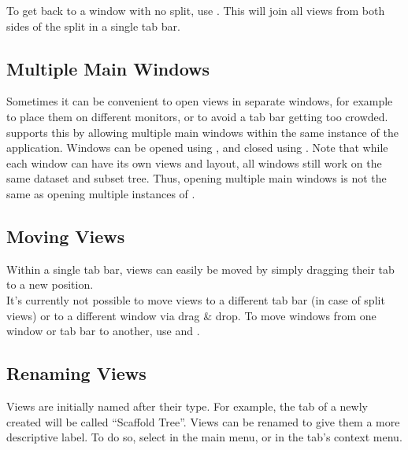 To get back to a window with no split, use .
This will join all views from both sides of the split in a single tab bar.


\subsection{Multiple Main Windows}

Sometimes it can be convenient to open views in separate windows, for example to place them on different monitors, or to avoid a tab bar getting too crowded.
\sh supports this by allowing multiple main windows within the same instance of the application.
Windows can be opened using , and closed using .
Note that while each window can have its own views and layout, all windows still work on the same dataset and subset tree.
Thus, opening multiple main windows is not the same as opening multiple instances of \sh.


\subsection{Moving Views} \label{sec:scaffoldhunter:viewmanagement:moving}

Within a single tab bar, views can easily be moved by simply dragging their tab to a new position.\\
It's currently not possible to move views to a different tab bar (in case of split views) or to a different window via drag \& drop.
To move windows from one window or tab bar to another, use  and .


\subsection{Renaming Views} \label{sec:scaffoldhunter:viewmanagement:renaming}

Views are initially named after their type.
For example, the tab of a newly created \stview will be called ``Scaffold Tree''.
Views can be renamed to give them a more descriptive label.
To do so, select  in the main menu, or  in the tab's context menu.

